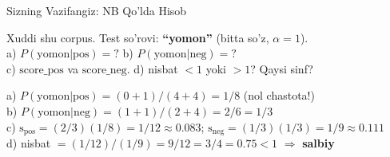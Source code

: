 \documentclass[aspectratio=169,11pt]{beamer}
\begin{document}
\begin{frame}{Sizning Vazifangiz: NB Qo'lda Hisob}
  \begin{tcolorbox}[warnbox,title=Vazifa (4 daqiqa)]
    \small
    Xuddi shu corpus.
    Test so'rovi: \textbf{``yomon''} (bitta so'z, $\alpha{=}1$).\\[4pt]
    a)\; $P(\text{yomon}|\text{pos}) = ?$\qquad
    b)\; $P(\text{yomon}|\text{neg}) = ?$\\[4pt]
    c)\; $\text{score\_pos}$ va $\text{score\_neg}$.\quad
    d)\; nisbat $<1$ yoki $>1$?\; Qaysi sinf?
  \end{tcolorbox}
  \pause
  \begin{tcolorbox}[okbox,title=Javob]
    \small
    a)\; $P(\text{yomon}|\text{pos})=(0{+}1)/(4{+}4)=1/8$
         \;\textcolor{halfgray}{\footnotesize (nol chastota!)}\\[4pt]
    b)\; $P(\text{yomon}|\text{neg})=(1{+}1)/(2{+}4)=2/6=1/3$\\[4pt]
    c)\; $\text{s}_\text{pos}=(2/3)(1/8)=1/12\approx 0.083$;\;
         $\text{s}_\text{neg}=(1/3)(1/3)=1/9\approx 0.111$\\[4pt]
    d)\; nisbat $=(1/12)/(1/9)=9/12=3/4=0.75<1$
         $\Rightarrow$ \textcolor{deepred}{\textbf{salbiy}} \checkmark
  \end{tcolorbox}
\end{frame}
\end{document}
